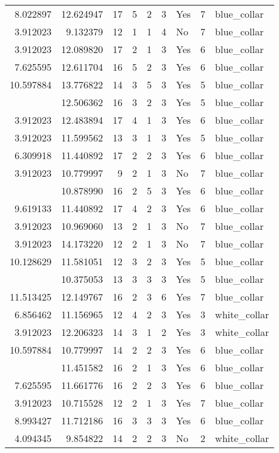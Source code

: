\documentclass[
]{article}
\begin{document}
\begin{longtable}[t]{rrrrrllrl}
8.022897 & 12.624947 & 17 & 5 & 2 & 3 & Yes & 7 & blue\_collar\\
3.912023 & 9.132379 & 12 & 1 & 1 & 4 & No & 7 & blue\_collar\\
3.912023 & 12.089820 & 17 & 2 & 1 & 3 & Yes & 6 & blue\_collar\\
7.625595 & 12.611704 & 16 & 5 & 2 & 3 & Yes & 6 & blue\_collar\\
10.597884 & 13.776822 & 14 & 3 & 5 & 3 & Yes & 5 & blue\_collar\\
\addlinespace
9.215328 & 12.506362 & 16 & 3 & 2 & 3 & Yes & 5 & blue\_collar\\
3.912023 & 12.483894 & 17 & 4 & 1 & 3 & Yes & 6 & blue\_collar\\
3.912023 & 11.599562 & 13 & 3 & 1 & 3 & Yes & 5 & blue\_collar\\
6.309918 & 11.440892 & 17 & 2 & 2 & 3 & Yes & 6 & blue\_collar\\
3.912023 & 10.779997 & 9 & 2 & 1 & 3 & No & 7 & blue\_collar\\
\addlinespace
9.310186 & 10.878990 & 16 & 2 & 5 & 3 & Yes & 6 & blue\_collar\\
9.619133 & 11.440892 & 17 & 4 & 2 & 3 & Yes & 6 & blue\_collar\\
3.912023 & 10.969060 & 13 & 2 & 1 & 3 & No & 7 & blue\_collar\\
3.912023 & 14.173220 & 12 & 2 & 1 & 3 & No & 7 & blue\_collar\\
10.128629 & 11.581051 & 12 & 3 & 2 & 3 & Yes & 5 & blue\_collar\\
\addlinespace
4.605170 & 10.375053 & 13 & 3 & 3 & 3 & Yes & 5 & blue\_collar\\
11.513425 & 12.149767 & 16 & 2 & 3 & 6 & Yes & 7 & blue\_collar\\
6.856462 & 11.156965 & 12 & 4 & 2 & 3 & Yes & 3 & white\_collar\\
3.912023 & 12.206323 & 14 & 3 & 1 & 2 & Yes & 3 & white\_collar\\
10.597884 & 10.779997 & 14 & 2 & 2 & 3 & Yes & 6 & blue\_collar\\
\addlinespace
3.912023 & 11.451582 & 16 & 2 & 1 & 3 & Yes & 6 & blue\_collar\\
7.625595 & 11.661776 & 16 & 2 & 2 & 3 & Yes & 6 & blue\_collar\\
3.912023 & 10.715528 & 12 & 2 & 1 & 3 & Yes & 7 & blue\_collar\\
8.993427 & 11.712186 & 16 & 3 & 3 & 3 & Yes & 6 & blue\_collar\\
4.094345 & 9.854822 & 14 & 2 & 2 & 3 & No & 2 & white\_collar\\

\end{longtable}
\end{document}
